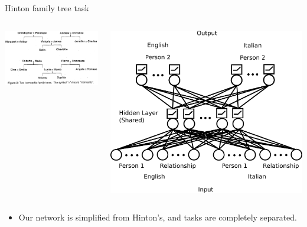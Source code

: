 \documentclass{beamer}
\begin{document}
\begin{frame}{Hinton family tree task}
\begin{columns}
    \begin{center}
	\includegraphics[width = \textwidth]{../writing/cogsci_2017/figures/hinton_family_tree_figure.png}
    \end{center}
    \begin{center}
	\includegraphics[width = \textwidth]{../writing/cogsci_2017/figures/family_tree_network_diagram.png}
    \end{center}
\end{columns}
\begin{itemize}
\item<2-> Our network is simplified from Hinton's, and tasks are completely separated.
\end{itemize}
\end{frame}
\end{document}
